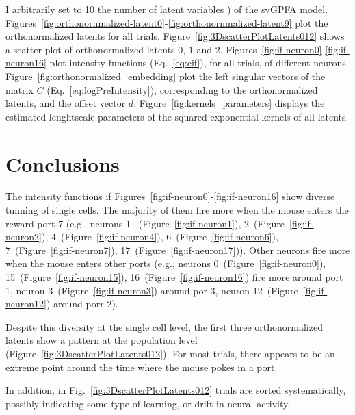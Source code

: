 \documentclass[12pt]{article}
\begin{document}
I arbitrarily set to 10 the number of latent variables \citep[$K$ in Eq.~1
of][]{dunckerAndSahani18}) of the svGPFA model.
%
Figures~\ref{fig:orthonornmalized-latent0}-\ref{fig:orthonornmalized-latent9}
plot the orthonormalized latents for all trials.
%
Figure~\ref{fig:3DscatterPlotLatents012} shows a scatter plot of
orthonormalized latents 0, 1 and 2.
%
Figures~\ref{fig:if-neuron0}-\ref{fig:if-neuron16} plot 
intensity functions (Eq.~\ref{eq:cif}), for all trials, of different neurons.
%
Figure~\ref{fig:orthonormalized_embedding} plot the left singular vectors of
the matrix $C$ (Eq.~\ref{eq:logPreIntensity}), corresponding to the
orthonormalized latents, and the offset vector $d$.
%
Figure~\ref{fig:kernels_parameters} displays the estimated lenghtscale
parameters of the squared exponential kernels of all latents.

\section{Conclusions}

The intensity functions if Figures~\ref{fig:if-neuron0}-\ref{fig:if-neuron16}
show diverse tunning of single cells. The majority of them fire more when the
mouse enters the reward port 7 (e.g., neurons 1~ (Figure~\ref{fig:if-neuron1}),
2~(Figure~\ref{fig:if-neuron2}), 4~(Figure~\ref{fig:if-neuron4}),
6~(Figure~\ref{fig:if-neuron6}), 7~(Figure~\ref{fig:if-neuron7}),
17~(Figure~\ref{fig:if-neuron17})). Other neurons fire more when the mouse
enters other ports (e.g., neurons 0~(Figure~\ref{fig:if-neuron0}),
15~(Figure~\ref{fig:if-neuron15}), 16~(Figure~\ref{fig:if-neuron16}) fire more
around port 1, neuron 3~(Figure~\ref{fig:if-neuron3})
around por 3, neuron 12~(Figure~\ref{fig:if-neuron12}) around porr 2).

Despite this diversity at the single cell level, the first three
orthonormalized latents show a pattern at the population level
(Figure~\ref{fig:3DscatterPlotLatents012}). For most trials, there appears to
be an extreme point around the time where the mouse pokes in a port.

In addition, in Fig.~\ref{fig:3DscatterPlotLatents012} trials are sorted
systematically, possibly indicating some type of learning, or drift in neural
activity.



\end{document}
